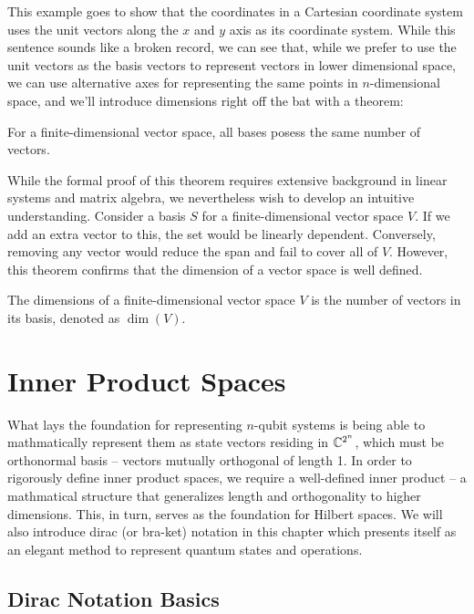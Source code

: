 \documentclass[12pt]{article}
\begin{document}
This example goes to show that the coordinates in a Cartesian coordinate system uses the unit vectors along the $x$ and $y$ axis as its coordinate system. While this sentence sounds like a broken record, we can see that, while we prefer to use the unit vectors as the basis vectors to represent vectors in lower dimensional space, we can use alternative axes for representing the same points in $n$-dimensional space, and we'll introduce dimensions right off the bat with a theorem:

\begin{theorem}
    For a finite-dimensional vector space, all bases posess the same number of vectors. 
\end{theorem}

While the formal proof of this theorem requires extensive background in linear systems and matrix algebra, we nevertheless wish to develop an intuitive understanding. Consider a basis $S$ for a finite-dimensional vector space $V$. If we add an extra vector to this, the set would be linearly dependent. Conversely, removing any vector would reduce the span and fail to cover all of $V$. However, this theorem confirms that the dimension of a vector space is well defined.

\begin{definition}[Dimension]
    The dimensions of a finite-dimensional vector space $V$ is the number of vectors in its basis, denoted as $\dim(V)$. 
\end{definition}

\break

\section{Inner Product Spaces}

What lays the foundation for representing $n$-qubit systems is being able to mathmatically represent them as state vectors residing in $\mathbb{C}^{2^n}$, which must be orthonormal basis – vectors mutually orthogonal of length 1. In order to rigorously define inner product spaces, we require a well-defined inner product – a mathmatical structure that generalizes length and orthogonality to higher dimensions. This, in turn, serves as the foundation for Hilbert spaces. We will also introduce dirac (or bra-ket) notation in this chapter which presents itself as an elegant method to represent quantum states and operations. 


\subsection{Dirac Notation Basics}
\end{document}
